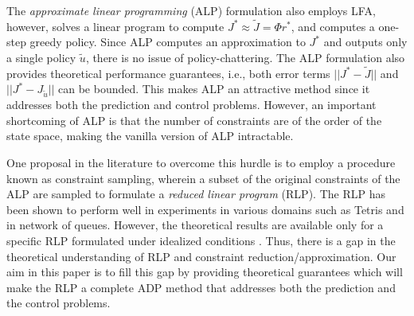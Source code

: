 The \emph{approximate linear programming} (ALP) \cite{ALP,CS,SALP,ALP-Bor,gkp,fs,npalp} formulation also employs LFA, however, solves a linear program to compute $J^*\approx\tilde{J}=\Phi r^*$, and computes a one-step greedy policy. Since ALP computes an approximation to $J^*$ and outputs only a single policy $\tilde{u}$, there is no issue of policy-chattering. The ALP formulation also provides theoretical performance guarantees, i.e., both error terms $||J^*-\tilde{J}||$ and $||J^*-J_{\tilde{u}}||$ can be bounded. This makes ALP an attractive method since it addresses both the prediction and control problems. However, an important shortcoming of ALP is that the number of constraints are of the order of the state space, making the vanilla version of ALP intractable.

One proposal in the literature to overcome this hurdle is to employ a procedure known as constraint sampling, wherein a subset of the original constraints of the ALP are sampled to formulate a \emph{reduced linear program} (RLP). The RLP has been shown to perform well in experiments \cite{ALP,CS,CST} in various domains such as Tetris and in network of queues. However, the theoretical results are available only for a specific RLP formulated under idealized conditions \cite{CS}. Thus, there is a gap in the theoretical understanding of RLP and constraint reduction/approximation. Our aim in this paper is to fill this gap by providing theoretical guarantees which will make the RLP a complete ADP method that addresses both the prediction and the control problems.

